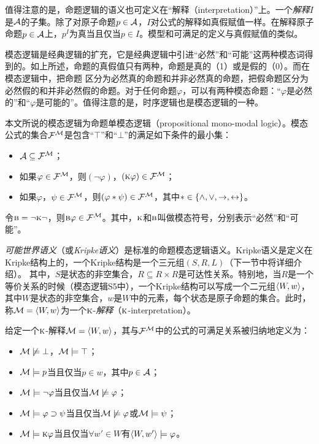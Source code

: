 值得注意的是，命题逻辑的语义也可定义在“解释（interpretation）”上。一个\emph{解释}$I$是${\cal A}$的子集。除了对原子命题$p\in {\cal A}$，$I$对公式的解释如真假赋值一样。在解释原子命题$p\in {\cal A}$上，$p^I$为真当且仅当$p\in I$。模型和可满足的定义与真假赋值的类似。

模态逻辑是经典逻辑的扩充，它是经典逻辑中引进“必然”和“可能”这两种模态词得到的。如上所述，命题的真假值只有两种，命题是真的（1）或是假的（0）。而在模态逻辑中，把命题
区分为必然真的命题和并非必然真的命题，把假命题区分为必然假的和并非必然假的命题。对于任何命题$\varphi$，可以有两种模态命题：“$\varphi$是必然的”和“$\varphi$是可能的”。值得注意的是，时序逻辑也是模态逻辑的一种。

本文所说的模态逻辑为命题单模态逻辑（propositional mono-modal logic）。模态公式的集合${\cal F}^{{\cal M}}$是包含“$\top$”和“$\bot$”的满足如下条件的最小集：
\begin{itemize}
	\item ${\cal A} \subseteq {\cal F}^{{\cal M}}$；
	\item 如果$\varphi \in {\cal F}^{{\cal M}}$，则$(\neg \varphi)$，$(\textsc{k} \varphi)\in {\cal F}^{{\cal M}}$；
	\item 如果$\varphi$，$\psi\in {\cal F}^{{\cal M}}$，则$(\varphi * \psi)\in {\cal F}^{{\cal M}}$，其中$*\in \{\wedge,\vee, \rightarrow, \leftrightarrow\}$。
\end{itemize}
令$\textsc{b} = \neg \textsc{k} \neg$，则$\textsc{b} \varphi \in {\cal F}^{{\cal M}}$。其中，$\textsc{k}$和$\textsc{b}$叫做模态符号，分别表示“必然”和“可能”。

\emph{可能世界语义}（或\emph{Kripke语义}）是标准的命题模态逻辑语义\cite{kripke1963semantical}。Kripke语义是定义在Kripke结构上的，一个Kripke结构是一个三元组$(S,R,L)$（下一节中将详细介绍）。
其中，$S$是状态的非空集合，$R\subseteq R \times R$是可达性关系。特别地，当$R$是一个等价关系的时候（模态逻辑S5中），一个Kripke结构可以写成一个二元组${\langle{W,w}\rangle}$，其中$W$是状态的非空集合，$w$是$W$中的元素，每个状态是原子命题的集合。此时，称${\cal M}={\langle{W,w}\rangle}$为一个$\textsc{k}$-\emph{解释}（$\textsc{k}$-interpretation）\cite{zhang2009knowledge}。

\begin{definition}\label{def:s5:interp}
	给定一个$\textsc{k}$-解释${\cal M}={\langle{W,w}\rangle}$，其与${\cal F}^{{\cal M}}$中的公式的可满足关系被归纳地定义为：
	\begin{itemize}
		\item ${\cal M} \not \models \bot$，${\cal M} \models \top$；
		\item ${\cal M} \models p$当且仅当$p\in w$，其中$p\in {\cal A}$；
		\item ${\cal M} \models \neg \varphi$当且仅当${\cal M} \not \models \varphi$；
		\item ${\cal M} \models \varphi \supset \psi$当且仅当${\cal M} \not \models \varphi$或${\cal M} \models \psi$；
		\item ${\cal M} \models \textsc{k} \varphi$当且仅当$\forall w'\in W$有${\langle{W, w'}\rangle}\models \varphi$。
	\end{itemize}
\end{definition}

